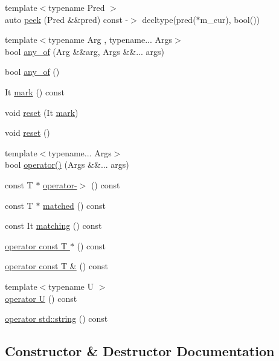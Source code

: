 \begin{DoxyCompactItemize}
\item 
{\footnotesize template$<$typename Pred $>$ }\\auto \hyperlink{class_matcher_a4c92e3958c64eee29812f4ed75c331cf}{peek} (Pred \&\&pred) const -\/$>$ decltype(pred($\ast$m\+\_\+cur), bool())
\item 
{\footnotesize template$<$typename Arg , typename... Args$>$ }\\bool \hyperlink{class_matcher_a1db8b27d158ba0010bf7c69559773112}{any\+\_\+of} (Arg \&\&arg, Args \&\&... args)
\item 
bool \hyperlink{class_matcher_a6cfab4944429c85a33d872691e0976c8}{any\+\_\+of} ()
\item 
It \hyperlink{class_matcher_af9135752ac195a21c230267d52db6623}{mark} () const
\item 
void \hyperlink{class_matcher_abb67aa2acac25b34d80ffb2e64eef44c}{reset} (It \hyperlink{class_matcher_af9135752ac195a21c230267d52db6623}{mark})
\item 
void \hyperlink{class_matcher_a18de8d97996c28deb6ac787f2a0981a6}{reset} ()
\item 
{\footnotesize template$<$typename... Args$>$ }\\bool \hyperlink{class_matcher_a2c1cbd69f6fcbbcf40e9e66333cfddca}{operator()} (Args \&\&... args)
\item 
const T $\ast$ \hyperlink{class_matcher_a3613bf19482915302d6647e25d9facb2}{operator-\/$>$} () const
\item 
const T $\ast$ \hyperlink{class_matcher_a6a43511495d338b4572dcb52e96fc3a3}{matched} () const
\item 
const It \hyperlink{class_matcher_abf9d0a1f24372dc9dde031ae6df26921}{matching} () const
\item 
\hyperlink{class_matcher_ae3f74b07e355126855e40db722c7a51d}{operator const T $\ast$} () const
\item 
\hyperlink{class_matcher_a7b808eac9d5d10c2d417869bf630d6ec}{operator const T \&} () const
\item 
{\footnotesize template$<$typename U $>$ }\\\hyperlink{class_matcher_a0bd21eb19304624235c6cb208fa1216a}{operator U} () const
\item 
\hyperlink{class_matcher_adc54a96fcfc40186d82a91baeb09211c}{operator std\+::string} () const
\end{DoxyCompactItemize}


\subsection{Constructor \& Destructor Documentation}
\mbox{\label{class_matcher_a6a90be25ea49908ed9d6c23f8bb9c47f}} 
